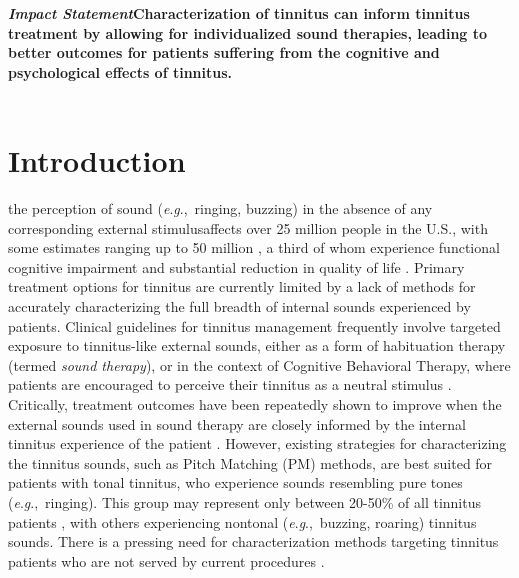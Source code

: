 \documentclass[journal]{IEEEtran}
\newcommand{\eg}{\textit{e}.\textit{g}.,\ }
\begin{document}
\begin{minipage}[t]{0.9\columnwidth}
  \textbf{\textit{Impact Statement}\textemdash{}Characterization of tinnitus can inform tinnitus treatment by allowing for individualized sound therapies, leading to better outcomes for patients suffering from the cognitive and psychological effects of tinnitus.}\\
\\
\end{minipage}

\section{Introduction}
\textemdash{}the perception of sound (\eg ringing, buzzing)
in the absence of any corresponding external stimulus\textemdash{}affects over 25 million people in the U.S., with some estimates ranging up to 50 million \cite{bhattPrevalenceSeverityExposures2016,nationalinstituteondeafnessandothercommunicationdisordersQuickStatisticsHearing},
a third of whom experience functional cognitive impairment and substantial reduction in quality of life
\cite{ahmedImpactTinnitusPerception2017,nondahlImpactTinnitusQuality2007,tegg-quinnImpactTinnitusCognition2016}.
Primary treatment options for tinnitus are currently limited by a lack of methods for accurately characterizing the full breadth of internal sounds experienced by patients.
Clinical guidelines for tinnitus management frequently involve targeted exposure to tinnitus-like external sounds, either as a form of habituation therapy (termed \textit{sound therapy}), or in the context of Cognitive Behavioral Therapy, where patients are encouraged to perceive their tinnitus as a neutral stimulus \cite{tunkelClinicalPracticeGuideline2014}.
Critically, treatment outcomes have been repeatedly shown to improve when the external sounds used in sound therapy are closely informed by the internal tinnitus experience of the patient
\cite{davisNeuromonicsTinnitusTreatment2007,landgrebeMethodologicalAspectsClinical2012,nickelOutcomeResearchMusic2005,okamotoListeningTailormadeNotched2010,schaetteAcousticStimulationTreatments2010,steinInhibitioninducedPlasticityTinnitus2015,tassCounteractingTinnitusAcoustic2012,wangStateArtSound2020}.
However, existing strategies for characterizing the tinnitus sounds, such as Pitch Matching (PM) methods, are best suited for patients with tonal tinnitus, who experience sounds resembling pure tones (\eg ringing).
This group may represent only between 20-50\% of all tinnitus patients \cite{turnerjrAuditoryDysfunctionTinnitus1990,henryAuditoryTestResult2009,ukaegbeTinnitusItsEffect2017}, with others experiencing nontonal (\eg buzzing, roaring) tinnitus sounds.
There is a pressing need for characterization methods targeting tinnitus patients who are not served by current procedures
\cite{henryTinnitusEpidemiologicPerspective2020,henryMeasurementTinnitus2016,norenaPsychoacousticCharacterizationTinnitus2002,robertsResidualInhibitionFunctions2006}.
\end{document}
